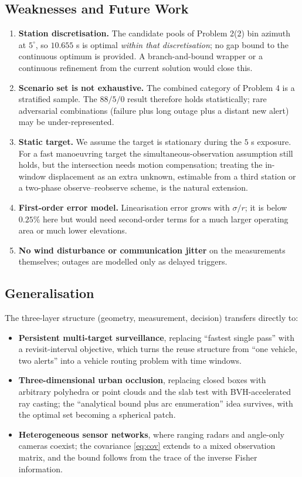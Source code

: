 \documentclass[12pt]{article}
\begin{document}
\subsection{Weaknesses and Future Work}

\begin{enumerate}[leftmargin=2em]
  \item \textbf{Station discretisation.} The candidate pools of Problem 2(2) bin azimuth at $5^\circ$, so $10.655$ s is optimal \emph{within that discretisation}; no gap bound to the continuous optimum is provided. A branch-and-bound wrapper or a continuous refinement from the current solution would close this.
  \item \textbf{Scenario set is not exhaustive.} The combined category of Problem 4 is a stratified sample. The $88/5/0$ result therefore holds statistically; rare adversarial combinations (failure plus long outage plus a distant new alert) may be under-represented.
  \item \textbf{Static target.} We assume the target is stationary during the $5$ s exposure. For a fast manoeuvring target the simultaneous-observation assumption still holds, but the intersection needs motion compensation; treating the in-window displacement as an extra unknown, estimable from a third station or a two-phase observe--reobserve scheme, is the natural extension.
  \item \textbf{First-order error model.} Linearisation error grows with $\sigma/r$; it is below $0.25\%$ here but would need second-order terms for a much larger operating area or much lower elevations.
  \item \textbf{No wind disturbance or communication jitter} on the measurements themselves; outages are modelled only as delayed triggers.
\end{enumerate}

\subsection{Generalisation}

The three-layer structure (geometry, measurement, decision) transfers directly to:
\begin{itemize}[leftmargin=2em]
  \item \textbf{Persistent multi-target surveillance}, replacing ``fastest single pass'' with a revisit-interval objective, which turns the reuse structure from ``one vehicle, two alerts'' into a vehicle routing problem with time windows.
  \item \textbf{Three-dimensional urban occlusion}, replacing closed boxes with arbitrary polyhedra or point clouds and the slab test with BVH-accelerated ray casting; the ``analytical bound plus arc enumeration'' idea survives, with the optimal set becoming a spherical patch.
  \item \textbf{Heterogeneous sensor networks}, where ranging radars and angle-only cameras coexist; the covariance \eqref{eq:cov} extends to a mixed observation matrix, and the bound follows from the trace of the inverse Fisher information.
\end{itemize}
\end{document}
